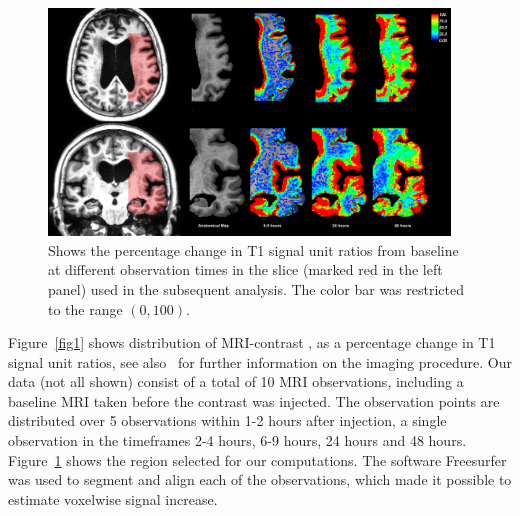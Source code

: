 \documentclass[12pt,a4paper]{article}
\begin{document}
\begin{figure}
\includegraphics[width=0.95\textwidth]{../Zoom-PatID.png} 
\caption{Shows the percentage change in T1 signal unit ratios from baseline at different observation times in the slice (marked red in the left panel) used in the subsequent analysis. The color bar was restricted to the range $(0,100)$. }
\label{fig2} 
\end{figure}
Figure~\ref{fig1} shows distribution of MRI-contrast%
, as a percentage change in T1 signal unit ratios, see also~\cite{ringstad2018brain} for further information on the imaging procedure.   
Our data (not all shown) consist of a total of 10 MRI observations, including a baseline MRI taken before the contrast was injected. The observation points are distributed over 5 observations within 1-2 hours after injection, a single observation in the timeframes 2-4 hours, 6-9 hours, 24 hours and 48 hours. 
Figure~\ref{fig2} shows the region selected for our computations. 
The software Freesurfer \cite{Dale1999179, FischlLiuDale, spf2007, reuter:robreg10} was used to segment and align each of the observations, which made it possible to estimate voxelwise signal increase. 

\end{document}
